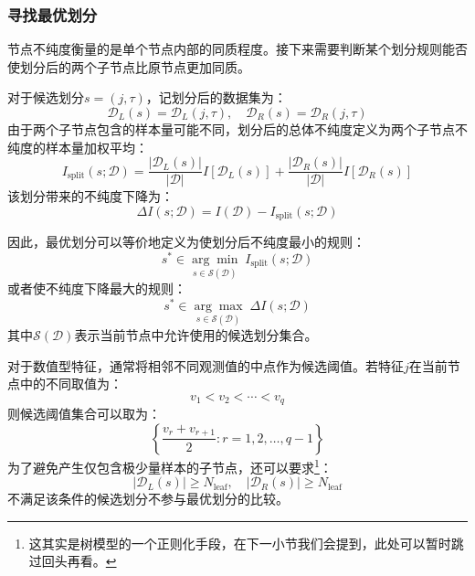 \subsubsection{寻找最优划分}
节点不纯度衡量的是单个节点内部的同质程度。接下来需要判断某个划分规则能否使划分后的两个子节点比原节点更加同质。\par
对于候选划分$s=(j,\tau)$，记划分后的数据集为：
\begin{equation*}
	\mathcal{D}_L(s)=\mathcal{D}_L(j,\tau),\quad\mathcal{D}_R(s)=\mathcal{D}_R(j,\tau)
\end{equation*}
由于两个子节点包含的样本量可能不同，划分后的总体不纯度定义为两个子节点不纯度的样本量加权平均：
\begin{equation*}
	I_{\mathrm{split}}(s;\mathcal{D})=\frac{|\mathcal{D}_L(s)|}{|\mathcal{D}|}I[\mathcal{D}_L(s)]+\frac{|\mathcal{D}_R(s)|}{|\mathcal{D}|}I[\mathcal{D}_R(s)]
\end{equation*}
该划分带来的不纯度下降为：
\begin{equation*}
	\Delta I(s;\mathcal{D})=I(\mathcal{D})-I_{\mathrm{split}}(s;\mathcal{D})
\end{equation*}\par
因此，最优划分可以等价地定义为使划分后不纯度最小的规则：
\begin{equation*}
	s^{\ast}\in\underset{s\in\mathcal{S}(\mathcal{D})}{\arg\min}\;I_{\mathrm{split}}(s;\mathcal{D})
\end{equation*}
或者使不纯度下降最大的规则：
\begin{equation*}
	s^{\ast}\in\underset{s\in\mathcal{S}(\mathcal{D})}{\arg\max}\;\Delta I(s;\mathcal{D})
\end{equation*}
其中$\mathcal{S}(\mathcal{D})$表示当前节点中允许使用的候选划分集合。\par
对于数值型特征，通常将相邻不同观测值的中点作为候选阈值。若特征$j$在当前节点中的不同取值为：
\begin{equation*}
	v_1<v_2<\cdots<v_q
\end{equation*}
则候选阈值集合可以取为：
\begin{equation*}
	\left\{\frac{v_r+v_{r+1}}{2}:r=1,2,\dots,q-1\right\}
\end{equation*}
为了避免产生仅包含极少量样本的子节点，还可以要求\footnote{这其实是树模型的一个正则化手段，在下一小节我们会提到，此处可以暂时跳过回头再看。}：
\begin{equation*}
	|\mathcal{D}_L(s)|\geqslant N_{\mathrm{leaf}},\quad|\mathcal{D}_R(s)|\geqslant N_{\mathrm{leaf}}
\end{equation*}
不满足该条件的候选划分不参与最优划分的比较。\par
